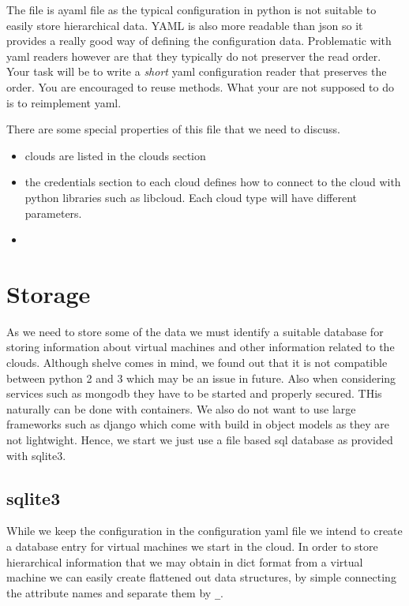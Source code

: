 The file is ayaml file as the typical configuration in python is not
suitable to easily store hierarchical data. YAML is also more readable
than json so it provides a really good way of defining the
configuration data. Problematic with yaml readers however are that
they typically do not preserver the read order. Your task will be to
write a {\em short} yaml configuration reader that preserves the
order. You are encouraged to reuse methods. What your are not supposed
to do is to reimplement yaml.

There are some special properties of this file that we need to
discuss. 

\begin{itemize}

\item clouds are listed in the clouds section
\item the credentials section to each cloud defines how to connect to
  the cloud with python libraries such as libcloud. Each cloud type will
  have different parameters.
\item 


\end{itemize}



\section{Storage}

As we need to store some of the data we must identify a suitable
database for storing information about virtual machines and other
information related to the clouds. Although shelve comes in mind, we
found out that it is not compatible between python 2 and 3 which may
be an issue in future. Also when considering services such as mongodb
they have to be started and properly secured. THis naturally can be
done with containers. We also do not want to use large frameworks such
as django which come with build in object models as they are not
lightwight. Hence, we start we just use a file based sql
database as provided with sqlite3.

\subsection{sqlite3}

While we keep the configuration in the configuration yaml file we
intend to create a database entry for virtual machines we start in the
cloud. In order to store hierarchical information that we may obtain
in dict format from a virtual machine we can easily create flattened
out data structures, by simple connecting the attribute names and
separate them by \verb|_|.

